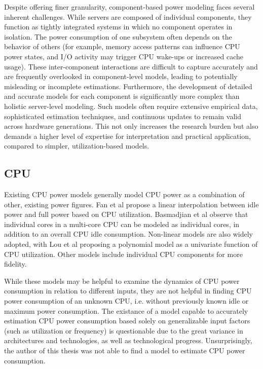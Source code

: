 Despite offering finer granularity, component-based power modeling faces several inherent challenges. While servers are composed of individual components, they function as tightly integrated systems in which no component operates in isolation. The power consumption of one subsystem often depends on the behavior of others (for example, memory access patterns can influence CPU power states, and I/O activity may trigger CPU wake-ups or increased cache usage). These inter-component interactions are difficult to capture accurately and are frequently overlooked in component-level models\parencite{lin2020taxonomy}, leading to potentially misleading or incomplete estimations. Furthermore, the development of detailed and accurate models for each component is significantly more complex than holistic server-level modeling. Such models often require extensive empirical data, sophisticated estimation techniques, and continuous updates to remain valid across hardware generations. This not only increases the research burden but also demands a higher level of expertise for interpretation and practical application, compared to simpler, utilization-based models.

\subsection{CPU}

Existing CPU power models generally model CPU power as a combination of other, existing power figures. Fan et al\parencite{fan2007power} propose a linear interpolation between idle power and full power based on CPU utilization. Basmadjian et al\parencite{basmadjianMethodologyPredictPower2011} observe that individual cores in a multi-core CPU can be modeled as individual cores, in addition to an overall CPU idle consumption. Non-linear models are also widely adopted, with Lou et al\parencite{LuoEnergyModeling2014} proposing a polynomial model as a univariate function of CPU utilization. Other models include individual CPU components\parencite{basmadjian2012evaluating, sarood2014maximizing} for more fidelity.

While these models may be helpful to examine the dynamics of CPU power consumption in relation to different inputs, they are not helpful in finding CPU power consumption of an unknown CPU, i.e. without previously known idle or maximum power consumption. The existance of a model capable to accurately estimation CPU power consumption based solely on generalizable input factors (such as utilization or frequency) is questionable due to the great variance in architectures and technologies, as well as technological progress. Unsurprisingly, the author of this thesis was not able to find a model to estimate CPU power consumption.

